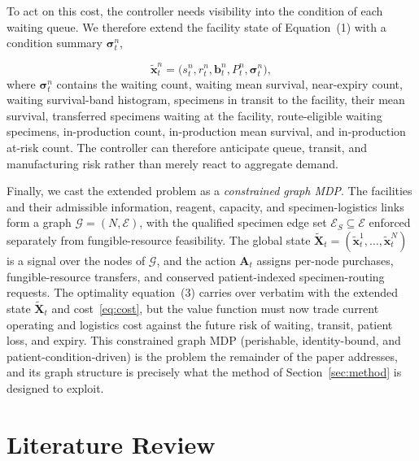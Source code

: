 \documentclass[preprint,review,12pt]{elsarticle}
\begin{document}
To act on this cost, the controller needs visibility into the condition of each waiting queue. We therefore extend the facility state of Equation~(1) with a condition summary $\boldsymbol{\sigma}^n_t$,

\begin{equation}
\label{eq:extended-state}
\tilde{\mathbf{x}}^n_t = \big(s^n_t, r^n_t, \mathbf{b}^n_t, P^n_t, \boldsymbol{\sigma}^n_t\big),
\end{equation}
where $\boldsymbol{\sigma}^n_t$ contains the waiting count, waiting mean survival, near-expiry count, waiting survival-band histogram, specimens in transit to the facility, their mean survival, transferred specimens waiting at the facility, route-eligible waiting specimens, in-production count, in-production mean survival, and in-production at-risk count. The controller can therefore anticipate queue, transit, and manufacturing risk rather than merely react to aggregate demand.

Finally, we cast the extended problem as a \emph{constrained graph MDP}. The facilities and their admissible information, reagent, capacity, and specimen-logistics links form a graph $\mathcal{G}=(N,\mathcal{E})$, with the qualified specimen edge set $\mathcal{E}_{S}\subseteq\mathcal{E}$ enforced separately from fungible-resource feasibility. The global state $\tilde{\mathbf{X}}_t=(\tilde{\mathbf{x}}^1_t,\ldots,\tilde{\mathbf{x}}^N_t)$ is a signal over the nodes of $\mathcal{G}$, and the action $\mathbf{A}_t$ assigns per-node purchases, fungible-resource transfers, and conserved patient-indexed specimen-routing requests. The optimality equation~(3) carries over verbatim with the extended state $\tilde{\mathbf{X}}_t$ and cost~\eqref{eq:cost}, but the value function must now trade current operating and logistics cost against the future risk of waiting, transit, patient loss, and expiry. This constrained graph MDP (perishable, identity-bound, and patient-condition-driven) is the problem the remainder of the paper addresses, and its graph structure is precisely what the method of Section~\ref{sec:method} is designed to exploit.


\section{Literature Review}
\label{sec:literature}
\end{document}
